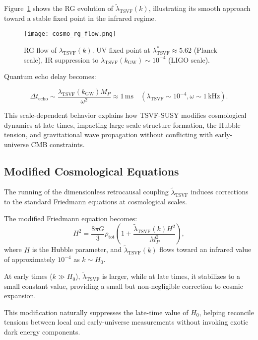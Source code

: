 \documentclass[twocolumn,superscriptaddress,floatfix]{revtex4-2}
\begin{document}
Figure~\ref{fig:cosmo_rg_flow} shows the RG evolution of \(\tilde{\lambda}_{\text{TSVF}}(k)\), illustrating its smooth approach toward a stable fixed point in the infrared regime.

\begin{figure}[htbp]
\centering
\texttt{[image: cosmo\_rg\_flow.png]}
\caption{RG flow of $\lambda_{\text{TSVF}}(k)$. UV fixed point at $\lambda_{\text{TSVF}}^* \approx 5.62$ (Planck scale), IR suppression to $\lambda_{\text{TSVF}}(k_{\text{GW}}) \sim 10^{-4}$ (LIGO scale).}  
\label{fig:cosmo_rg_flow}
\end{figure}  

Quantum echo delay becomes:  

\begin{equation}  
\Delta t_{\text{echo}} \sim \frac{\lambda_{\text{TSVF}}(k_{\text{GW}})M_P}{\omega^2} \approx 1\,\text{ms}\quad(\lambda_{\text{TSVF}} \sim 10^{-4}, \omega \sim 1\,\text{kHz}).  
\end{equation}  

This scale-dependent behavior explains how TSVF-SUSY modifies cosmological dynamics at late times, impacting large-scale structure formation, the Hubble tension, and gravitational wave propagation without conflicting with early-universe CMB constraints.


\subsection{Modified Cosmological Equations}
\label{subsec:cosmo_eqns}

The running of the dimensionless retrocausal coupling \(\tilde{\lambda}_{\text{TSVF}}\) induces corrections to the standard Friedmann equations at cosmological scales.

The modified Friedmann equation becomes:
\begin{equation}
H^2 = \frac{8\pi G}{3} \rho_{\text{tot}} \left(1 + \frac{\tilde{\lambda}_{\text{TSVF}}(k) H^2}{M_P^2}\right),
\label{eq:friedmann}
\end{equation}
where \(H\) is the Hubble parameter, and \(\tilde{\lambda}_{\text{TSVF}}(k)\) flows toward an infrared value of approximately \(10^{-4}\) as \(k \sim H_0\).

At early times (\(k \gg H_0\)), \(\tilde{\lambda}_{\text{TSVF}}\) is larger, while at late times, it stabilizes to a small constant value, providing a small but non-negligible correction to cosmic expansion.

This modification naturally suppresses the late-time value of \(H_0\), helping reconcile tensions between local and early-universe measurements without invoking exotic dark energy components.
\end{document}
